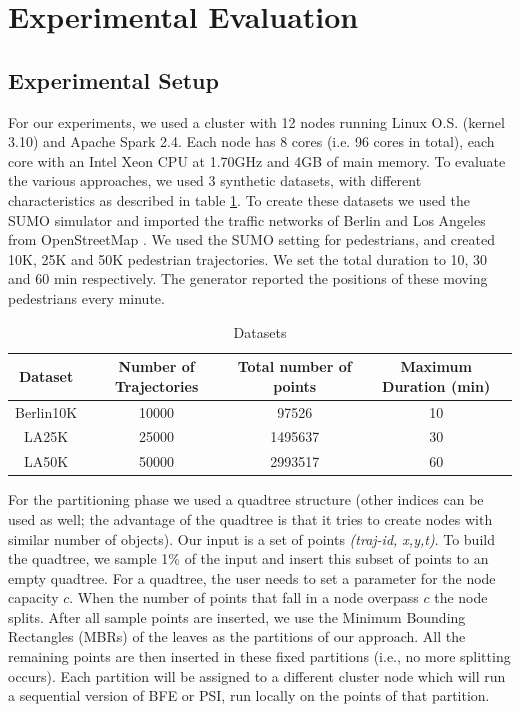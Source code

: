 \section{Experimental Evaluation}
\subsection{Experimental Setup}
For our experiments, we used a cluster with 12 nodes running Linux O.S. (kernel 3.10) and Apache Spark 2.4. Each node has 8 cores (i.e. 96 cores in total), each core with an Intel Xeon CPU at 1.70GHz and 4GB of main memory.
To evaluate the various approaches, we used 3 synthetic datasets, with different characteristics as described in table \ref{tab:datasets}. To create these datasets we used the SUMO simulator \cite{SUMO2012} and imported the traffic networks of Berlin and Los Angeles from OpenStreetMap \cite{haklay2008openstreetmap}. We used the SUMO setting for pedestrians, and created 10K, 25K and 50K pedestrian trajectories. We set the total duration to 10, 30 and 60 min respectively. The generator reported the positions of these moving pedestrians every minute.

\begin{table}
    \centering
    \begin{tabular}{cccc}
        \hline
        Dataset & Number of Trajectories & Total number of points & Maximum Duration (min) \\
        \hline
         Berlin10K &  10000 & 97526 & 10\\ 
         LA25K &  25000 & 1495637 & 30\\
         LA50K &  50000 & 2993517 & 60\\
         \hline
    \end{tabular}
    \caption{Datasets}
    \label{tab:datasets}
\end{table}

For the partitioning phase we used a quadtree structure (other indices can be used as well; the advantage of the quadtree is that it tries to create nodes with similar number of objects). 
Our input is a set of points \textit{(traj-id, x,y,t)}. To build the quadtree, we sample 1\% of the input and insert this subset of points to an empty quadtree. For a quadtree, the user needs to set a parameter for the node capacity $c$. When the number of points that fall in a node overpass $c$ the node splits. After all sample points are inserted, we use the Minimum Bounding Rectangles (MBRs) of the leaves as the partitions of our approach. All the remaining points are then inserted in these fixed partitions (i.e., no more splitting occurs). Each partition will be assigned to a different cluster node which will run a sequential version of BFE or PSI, run locally on the points of that partition.

